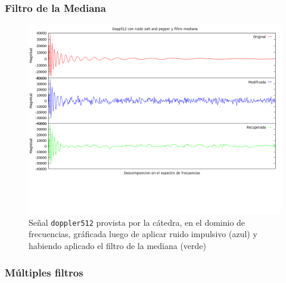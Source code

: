 \subsubsection{Filtro de la Mediana}

\begin{figure}[H]
\begin {center}
\includegraphics[width=500pt]{imagenes/dopp512-imp-median.png}
\end {center}
\caption{Se\~nal \texttt{doppler512} provista por la c\'atedra, en el dominio de frecuencias, gr\'aficada
luego de aplicar ruido impulsivo (azul) y habiendo aplicado el filtro de la mediana (verde)}
\label{fig:SinProm}
\end{figure}


\subsubsection{M\'ultiples filtros}

